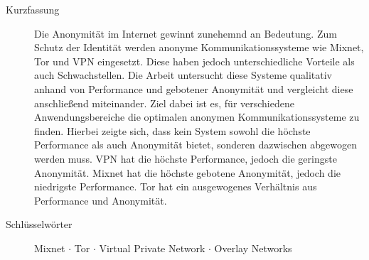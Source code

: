 \begin{description}
    \item[Kurzfassung] Die Anonymität im Internet gewinnt zunehemnd an Bedeutung. Zum Schutz der Identität werden anonyme Kommunikationssysteme wie Mixnet, Tor und VPN eingesetzt. Diese haben jedoch unterschiedliche Vorteile als auch Schwachstellen. Die Arbeit untersucht diese Systeme qualitativ anhand von Performance und gebotener Anonymität und vergleicht diese anschließend miteinander. Ziel dabei ist es, für verschiedene Anwendungsbereiche die optimalen anonymen Kommunikationssysteme zu finden. Hierbei zeigte sich, dass kein System sowohl die höchste Performance als auch Anonymität bietet, sonderen dazwischen abgewogen werden muss. VPN hat die höchste Performance, jedoch die geringste Anonymität. Mixnet hat die höchste gebotene Anonymität, jedoch die niedrigste Performance. Tor hat ein ausgewogenes Verhältnis aus Performance und Anonymität.
    \item[Schlüsselwörter] Mixnet $\cdot$ Tor $\cdot$ Virtual Private Network $\cdot$ Overlay Networks
\end{description}
